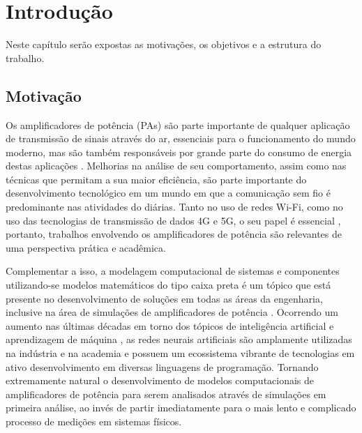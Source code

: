 \chapter{Introdução} \label{cha:introd}
Neste capítulo serão expostas as motivações, os objetivos e a estrutura do trabalho.
\label{item:PI}
\label{item:PA}
\label{item:TLP}
\label{item:MLP}
\label{item:ANN}
\label{item:DPD}
\label{item:PoD}
\label{item:4G}
\label{item:5G}
\label{item:TCC}
\label{item:NMSE}
\label{item:MSE}

\section{Motivação} \label{sec:introd-motiv}
Os amplificadores de potência (PAs) são parte importante de qualquer aplicação de transmissão de sinais através do ar, essenciais para o funcionamento do mundo moderno, mas são também responsáveis por grande parte do consumo de energia destas aplicações \cite{raychaudhuri_frontiers_2012}. Melhorias na análise de seu comportamento, assim como nas técnicas que permitam a sua maior eficiência, são parte importante do desenvolvimento tecnológico em um mundo em que a comunicação sem fio é predominante nas atividades do diárias. Tanto no uso de redes Wi-Fi, como no uso das tecnologias de transmissão de dados 4G e 5G, o seu papel é essencial \cite{9676485}, portanto, trabalhos envolvendo os amplificadores de potência são relevantes de uma perspectiva prática e acadêmica.

Complementar a isso, a modelagem computacional de sistemas e componentes utilizando-se modelos matemáticos do tipo caixa preta é um tópico que está presente no desenvolvimento de soluções em todas as áreas da engenharia, inclusive na área de simulações de amplificadores de potência \cite{pedro_comparative_2005}. Ocorrendo um aumento nas últimas décadas em torno dos tópicos de inteligência artificial e aprendizagem de máquina \cite{Zhao2021}, as redes neurais artificiais são amplamente utilizadas na indústria e na academia e possuem um ecossistema vibrante de tecnologias em ativo desenvolvimento em diversas linguagens de programação. Tornando extremamente natural o desenvolvimento de modelos computacionais de amplificadores de potência para serem analisados através de simulações em primeira análise, ao invés de partir imediatamente para o mais lento e complicado processo de medições em sistemas físicos.

